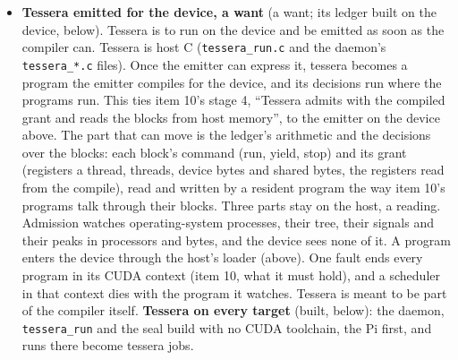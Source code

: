\begin{enumerate}
\begin{itemize}
\begin{itemize}
\begin{itemize}
\item \textbf{Built} (everything on the device). The emitter's decisions, keymath's imprint and key\_\allowbreak{}schedule's lay are each one source the host and the device compile (\texttt{emit\_\allowbreak{}core.\allowbreak{}h}, \texttt{keymath\_\allowbreak{}core.\allowbreak{}h}, \texttt{key\_\allowbreak{}schedule\_\allowbreak{}core.\allowbreak{}h}). The device lays a program's step table, decides each step's forms a thread a step, cuts the lane into states in one thread, and writes the lane's text with the text program (\texttt{emit\_\allowbreak{}text.\allowbreak{}\{h,cu\}}, \texttt{emit\_\allowbreak{}device.\allowbreak{}\{h,cu\}}). \texttt{EMIT\_\allowbreak{}DEVICE=1} has the record machine's lanes written by the device and held to the host's text byte for byte. \textbf{Measured}, each device run a tessera job on Windows (RTX 3070): \texttt{emit\_\allowbreak{}device\_\allowbreak{}test} 121 checks, 0 failed, the bootstrap included, the emitter's text in PTX 170,922, C 412,182 and VHDL 554,754 bytes; \texttt{EMIT\_\allowbreak{}DEVICE=1} \texttt{record\_\allowbreak{}bitwise\_\allowbreak{}test} 25 checks, 0 failed, 8 programs written by the device byte for byte the host's, the largest 4,204 steps and 2,051,022 bytes. Not exercised: \texttt{engine.\allowbreak{}cu}'s \texttt{engine\_\allowbreak{}record\_\allowbreak{}lay\_\allowbreak{}device}. These are \texttt{codegen\_\allowbreak{}device}, \texttt{asm\_\allowbreak{}printer} and \texttt{CODEGEN\_\allowbreak{}DEVICE} (item 13).
\end{itemize}
\item \textbf{Tessera emitted for the device, a want} (a want; its ledger built on the device, below). Tessera is to run on the device and be emitted as soon as the compiler can. Tessera is host C (\texttt{tessera\_\allowbreak{}run.\allowbreak{}c} and the daemon's \texttt{tessera\_\allowbreak{}*.\allowbreak{}c} files). Once the emitter can express it, tessera becomes a program the emitter compiles for the device, and its decisions run where the programs run. This ties item 10's stage 4, “Tessera admits with the compiled grant and reads the blocks from host memory”, to the emitter on the device above. The part that can move is the ledger's arithmetic and the decisions over the blocks: each block's command (run, yield, stop) and its grant (registers a thread, threads, device bytes and shared bytes, the registers read from the compile), read and written by a resident program the way item 10's programs talk through their blocks. Three parts stay on the host, a reading. Admission watches operating-system processes, their tree, their signals and their peaks in processors and bytes, and the device sees none of it. A program enters the device through the host's loader (above). One fault ends every program in its CUDA context (item 10, what it must hold), and a scheduler in that context dies with the program it watches. Tessera is meant to be part of the compiler itself. \textbf{Tessera on every target} (built, below): the daemon, \texttt{tessera\_\allowbreak{}run} and the seal build with no CUDA toolchain, the Pi first, and runs there become tessera jobs.


\end{itemize}
\end{itemize}
\end{enumerate}
